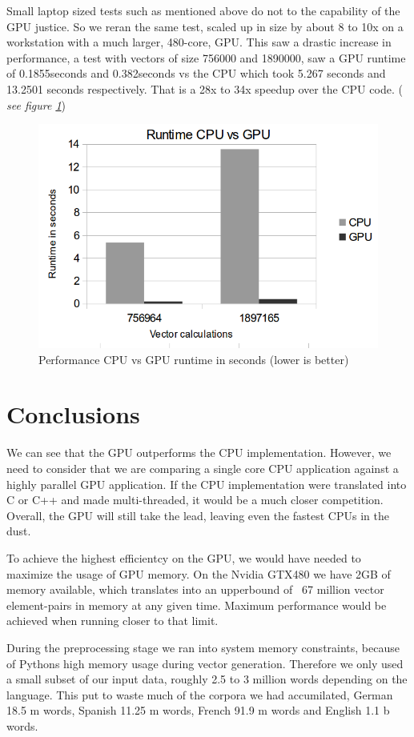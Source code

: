 \documentclass[12pt]{article}
\begin{document}
Small laptop sized tests such as mentioned above do not to the capability of the GPU justice. So we reran the same test, scaled up in size by about 8 to 10x on a workstation with a much larger, 480-core, GPU. This saw a drastic increase in performance, a test with vectors of size 756000 and 1890000, saw a GPU runtime of 0.1855seconds and 0.382seconds vs the CPU which took 5.267 seconds and 13.2501 seconds respectively. That is a 28x to 34x speedup over the CPU code. (\emph{ see figure \ref{graph}})
\begin{figure}[htb]
\centering
\includegraphics[scale=.5]{graph.png}
\caption{Performance CPU vs GPU runtime in seconds (lower is better)}
  \label{graph}
\end{figure}
\section{Conclusions}
We can see that the GPU outperforms the CPU implementation. However, we need to consider that we are comparing a single core CPU application against a highly parallel GPU application. If the CPU implementation were translated into C or C++ and made multi-threaded, it would be a much closer competition. Overall, the GPU will still take the lead, leaving even the fastest CPUs in the dust.

To achieve the highest efficientcy on the GPU, we would have needed to maximize the usage of GPU memory. On the Nvidia GTX480 we have 2GB of memory available, which translates into an upperbound of ~67 million vector element-pairs in memory at any given time. Maximum performance would be achieved when running closer to that limit. 

During the preprocessing stage we ran into system memory constraints, because of Pythons high memory usage during vector generation. Therefore we only used a small subset of our input data, roughly 2.5 to 3 million words depending on the language. This put to waste much of the corpora we had accumilated, German 18.5 m words, Spanish 11.25 m words, French 91.9 m words and English 1.1 b words.
\end{document}
